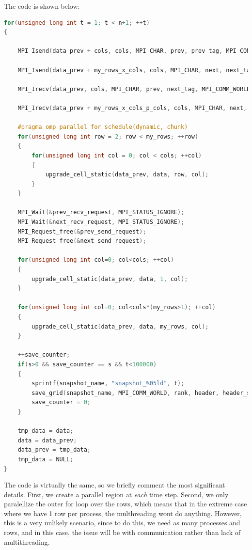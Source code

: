\documentclass{report}
\begin{document}
The code is shown below:

\begin{lstlisting}[language=C++]
for(unsigned long int t = 1; t < n+1; ++t)
{

    MPI_Isend(data_prev + cols, cols, MPI_CHAR, prev, prev_tag, MPI_COMM_WORLD, &prev_send_request);

    MPI_Isend(data_prev + my_rows_x_cols, cols, MPI_CHAR, next, next_tag, MPI_COMM_WORLD, &next_send_request);

    MPI_Irecv(data_prev, cols, MPI_CHAR, prev, next_tag, MPI_COMM_WORLD, &prev_recv_request);

    MPI_Irecv(data_prev + my_rows_x_cols_p_cols, cols, MPI_CHAR, next, prev_tag, MPI_COMM_WORLD, &next_recv_request);

    #pragma omp parallel for schedule(dynamic, chunk)
    for(unsigned long int row = 2; row < my_rows; ++row)
    {
        for(unsigned long int col = 0; col < cols; ++col)
        {
            upgrade_cell_static(data_prev, data, row, col);
        }
    }

    MPI_Wait(&prev_recv_request, MPI_STATUS_IGNORE);
    MPI_Wait(&next_recv_request, MPI_STATUS_IGNORE);
    MPI_Request_free(&prev_send_request);
    MPI_Request_free(&next_send_request);

    for(unsigned long int col=0; col<cols; ++col)
    {
        upgrade_cell_static(data_prev, data, 1, col);
    }

    for(unsigned long int col=0; col<cols*(my_rows>1); ++col)
    {
        upgrade_cell_static(data_prev, data, my_rows, col);
    }

    ++save_counter;
    if(s>0 && save_counter == s && t<100000)
    {
        sprintf(snapshot_name, "snapshot_%05ld", t);
        save_grid(snapshot_name, MPI_COMM_WORLD, rank, header, header_size, my_total_file_offset, data, my_rows, cols);
        save_counter = 0;
    }

    tmp_data = data;
    data = data_prev;
    data_prev = tmp_data;
    tmp_data = NULL;
}
\end{lstlisting}

The code is virtually the same, so we briefly comment the most significant 
details. First, we create a parallel region at \textit{each} time step. 
Second, we only paralellize the outer for loop over the rows, which means that 
in the extreme case where we have 1 row per process, the multhreading wont do 
anything. However, this is a very unlikely scenario, since to do this, we need 
as many processes and rows, and in this case, the issue will be with communication 
rather than lack of multithreading.
\end{document}
